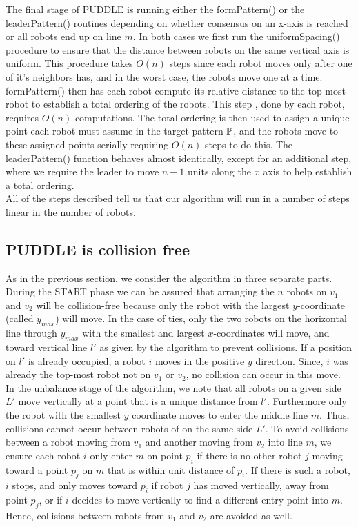 \documentclass[preprint,10pt]{elsarticle}
\begin{document}
		The final stage of PUDDLE is running either the formPattern() or the leaderPattern() routines depending on
		whether consensus on an x-axis is reached or all robots end up on line $m$. In both cases we first run the 
		uniformSpacing() procedure to ensure that the distance between robots on the same vertical axis is uniform.
		This procedure takes $O(n)$ steps since each robot moves only after one of it's neighbors has, and in 
		the worst case, the robots move one at a time. formPattern() then has each robot compute its relative
		distance to the top-most robot to establish a total ordering of the robots. This step
		, done by each robot, requires $O(n)$ computations. The total ordering is then used to assign a
		unique point each robot must assume in the target pattern $\mathbb{P}$, and the robots move to these 
		assigned points serially requiring $O(n)$ steps to do this. The leaderPattern() function behaves almost
		identically, except for an additional step, where we require the leader to move $n-1$ units along the
		$x$ axis to help establish a total ordering. \\

		All of the steps described tell us that our algorithm will run in a number of steps linear in the 
		number of robots.  


		\subsection{PUDDLE is collision free} 
		As in the previous section, we consider the algorithm in three separate parts. During the START phase
		we can be assured that arranging the $n$ robots on $v_1$ and $v_2$ will be collision-free because only the
		robot with the largest $y$-coordinate (called $y_{max}$) will move. In the case of ties, only the two robots
		on the horizontal line through $y_{max}$ with the smallest and largest $x$-coordinates will move, and toward
		vertical line $l'$ as given by the algorithm to prevent collisions. 
		If a position on $l'$ is already occupied, a robot $i$
		moves in the positive $y$ direction. Since, $i$ was already the top-most robot not on $v_1$ or $v_2$, no collision
		can occur in this move. \\

		In the unbalance stage of the algorithm, we note that all robots on a given side $L'$ move vertically at a point 
		that is a unique distance from $l'$. Furthermore only the robot with the smallest $y$ coordinate
		moves to enter the middle line $m$. Thus, collisions cannot occur between robots of on the same side $L'$.
		To avoid collisions between a robot moving from $v_1$ and another moving from $v_2$ into line $m$, we ensure each
		robot $i$ only enter $m$ on point $p_i$ if there is no other robot $j$ moving toward a point $p_j$ on $m$
		that is within unit distance of $p_i$. If there is such a robot, $i$ stops, and only moves toward $p_i$ if
		robot $j$ has moved vertically, away from point $p_j$, or if $i$ decides to move vertically to find a 
		different entry point into $m$. Hence, collisions between robots from $v_1$ and $v_2$ are avoided as well. \\
\end{document}
